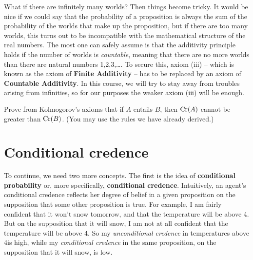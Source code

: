 What if there are infinitely many worlds? Then things become tricky.
It would be nice if we could say that the probability of a proposition
is always the sum of the probability of the worlds that make up the
proposition, but if there are too many worlds, this turns out to be
incompatible with the mathematical structure of the real numbers. The
most one can safely assume is that the additivity principle holds if
the number of worlds is \emph{countable}, meaning that there are no
more worlds than there are natural numbers 1,2,3,\ldots. To secure
this, axiom (iii) -- which is known as the axiom of \textbf{Finite
  Additivity} -- has to be replaced by an axiom of \textbf{Countable
  Additivity}. 
%
%
In this course, we will try to stay away from troubles arising from
infinities, so for our purposes the weaker axiom (iii) will be enough.

\begin{exercise3}
  Prove from Kolmogorov's axioms that if $A$ entails $B$, then
  $\text{Cr}(A)$ cannot be greater than $\text{Cr}(B)$. (You may use the rules we
  have already derived.)%
\end{exercise3}


\section{Conditional credence}\label{sec:conditional}

To continue, we need two more concepts. The first is the idea of
\textbf{conditional probability} or, more specifically,
\textbf{conditional credence}.  Intuitively, an agent's conditional
credence reflects her degree of belief in a given proposition on the
supposition that some other proposition is true. For example, I am
fairly confident that it won't snow tomorrow, and that the temperature
will be above 4\celsius. But on the supposition that it will snow, I
am not at all confident that the temperature will be above
4\celsius. So my \emph{unconditional credence} in temperatures above
4\celsius is high, while my \emph{conditional credence} in the same
proposition, on the supposition that it will snow, is low.

